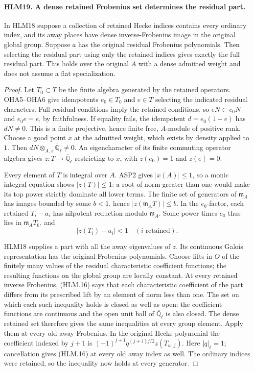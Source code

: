 \documentclass[11pt,a4paper]{article}
\numberwithin{equation}{section}
\theoremstyle{remark}\newtheorem{remark}[theorem]{Remark}
\begin{document}
\paragraph{HLM19. A dense retained Frobenius set determines the residual part.}
\label{claim:HLM19}
In HLM18 suppose a collection of retained Hecke indices
contains every ordinary index, and its away places have
dense inverse-Frobenius image in the original global group.
Suppose \(a\) has the original residual Frobenius
polynomials.  Then selecting the residual part using only
the retained indices gives exactly the full residual part.
This holds over the original \(A\) with a dense admitted
weight and does not assume a flat specialization.
\begin{proof}
Let \(T_0\subset T\) be the finite algebra generated by
the retained operators.  OHA5--OHA6 give idempotents
\(e_0\in T_0\) and \(e\in T\) selecting the indicated
residual characters.  Full residual conditions imply the
retained conditions, so \(eN\subset e_0N\) and
\(e_0e=e\), by faithfulness.  If equality fails, the
idempotent \(d=e_0(1-e)\) has \(dN\ne0\).  This is
a finite projective, hence finite free, \(A\)-module of
positive rank.  Choose a good point \(x\) at the admitted
weight, which exists by density applied to \(1\).
Then \(dN\otimes_{A,x}\overline{\mathbb Q}_\ell\ne0\).
An eigencharacter of its finite commuting operator algebra
gives \(z:T\to\overline{\mathbb Q}_\ell\) restricting
to \(x\), with \(z(e_0)=1\) and \(z(e)=0\).

Every element of \(T\) is integral over \(A\).  ASP2
gives \(|x(A)|\leq1\), so a monic integral equation
shows \(|z(T)|\leq1\): a root of norm greater than one
would make its top power strictly dominate all lower terms.
The finite set of generators of \(\mathfrak m_A\) has
images bounded by some \(b<1\), hence
\(|z(\mathfrak m_AT)|\leq b\).  In the \(e_0\)-factor,
each retained \(T_i-a_i\) has nilpotent reduction modulo
\(\mathfrak m_A\).  Some power times \(e_0\) thus
lies in \(\mathfrak m_AT_0\), and
\[
                 |z(T_i)-a_i|<1
                 \quad(i\text{ retained}).
 \tag{HLM.16}
\]

HLM18 supplies a part with all the away eigenvalues of
\(z\).  Its continuous Galois representation has the
original Frobenius polynomials.  Choose lifts in \(O\)
of the finitely many values of the residual characteristic
coefficient functions; the resulting functions on the
global group are locally constant.  At every retained
inverse Frobenius, (HLM.16) says that each characteristic
coefficient of the part differs from its prescribed lift
by an element of norm less than one.  The set on which
each such inequality holds is closed as well as open:
the coefficient functions are continuous and the open
unit ball of \(\overline{\mathbb Q}_\ell\) is also
closed.  The dense retained set therefore gives the same
inequalities at every group element.  Apply them at every
old away Frobenius.  In the original Hecke polynomial the
coefficient indexed by \(j+1\) is
\((-1)^{j+1}q^{(j+1)j/2}z(T_{w,j})\).
Here \(|q|_\ell=1\); cancellation gives (HLM.16) at
every old away index as well.  The ordinary indices were
retained, so the inequality now holds at every generator.


\end{proof}
\end{document}
